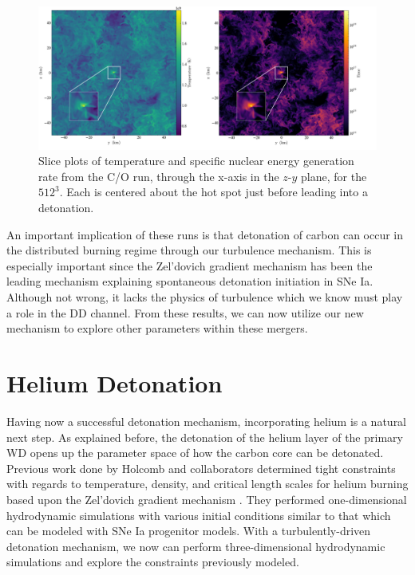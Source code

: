 \begin{center}
\begin{figure}[hp]

\includegraphics[width=1.0\textwidth]{combined_slice_carbon.png}
\centering
\caption[Slice plots of temperature and specific nuclear energy generation rate, through the maximum temperature in the $z$-$y$ plane, for the $512^3$ run]{Slice plots of temperature and specific nuclear energy generation rate from the C/O run, through the x-axis in the $z$-$y$ plane, for the $512^3$. Each is centered about the hot spot just before leading into a detonation.}
\label {fig:temp_enuc}

\end{figure}
\end{center}

An important implication of these runs is that detonation of carbon can occur in the distributed burning regime through our turbulence mechanism. This is especially important since the Zel'dovich gradient mechanism has been the leading mechanism explaining spontaneous detonation initiation in SNe Ia. Although not wrong, it lacks the physics of turbulence which we know must play a role in the DD channel. From these results, we can now utilize our new mechanism to explore other parameters within these mergers.

\section{Helium Detonation}

Having now a successful detonation mechanism, incorporating helium is a natural next step. As explained before, the detonation of the helium layer of the primary WD opens up the parameter space of how the carbon core can be detonated. Previous work done by Holcomb and collaborators determined tight constraints with regards to temperature, density, and critical length scales for helium burning based upon the Zel'dovich gradient mechanism \cite{holcomb}. They performed one-dimensional hydrodynamic simulations with various initial conditions similar to that which can be modeled with SNe Ia progenitor models. With a turbulently-driven detonation mechanism, we now can perform three-dimensional hydrodynamic simulations and explore the constraints previously modeled.

